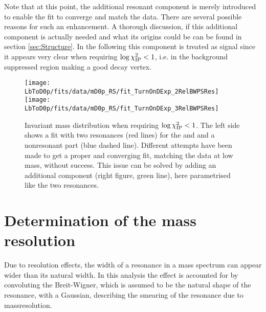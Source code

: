 Note that at this point, the additional resonant component is merely introduced to enable the fit to converge and match the data.
There are several possible reasons for such an enhancement.
A thorough discussion, if this additional component is actually needed and what its origins could be can be found in section \ref{sec:Structure}.
In the following this component is treated as signal since it appears very clear when requiring $\log \chi^2_{\text{IP}} < 1$, i.e. in the background suppressed region making a good decay vertex.
\begin{figure}[hptb]
    \centering
	\texttt{[image: LbToD0p/fits/data/mD0p\_RS/fit\_TurnOnDExp\_2RelBWPSRes]}
	\texttt{[image: LbToD0p/fits/data/mD0p\_RS/fit\_TurnOnDExp\_3RelBWPSRes]}
	\caption{Invariant \Dz\proton mass distribution when requiring $\log \chi^2_{\text{IP}} < 1$. 
             The left side shows a fit with two resonances (red lines) for the \LcResI and \LcResII and a nonresonant part (blue dashed line). 
             Different attempts have been made to get a proper and converging fit, matching the data at low \Dz\proton mass, without success. 
             This issue can be solved by adding an additional component (right figure, green line), here parametrised like the two resonances.}
    \label{fig:fit_mD0p_RS}
\end{figure}


\section{Determination of the mass resolution}
\label{sec:Massresolution}
Due to resolution effects, the width of a resonance in a mass spectrum can appear wider than its natural width.
In this analysis the effect is accounted for by convoluting the Breit-Wigner, which is assumed to be the natural shape of the resonance, with a Gaussian, describing the smearing of the resonance due to massresolution.

